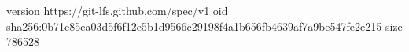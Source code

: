 version https://git-lfs.github.com/spec/v1
oid sha256:0b71c85ea03d5f6f12e5b1d9566c29198f4a1b656fb4639af7a9be547fe2e215
size 786528
